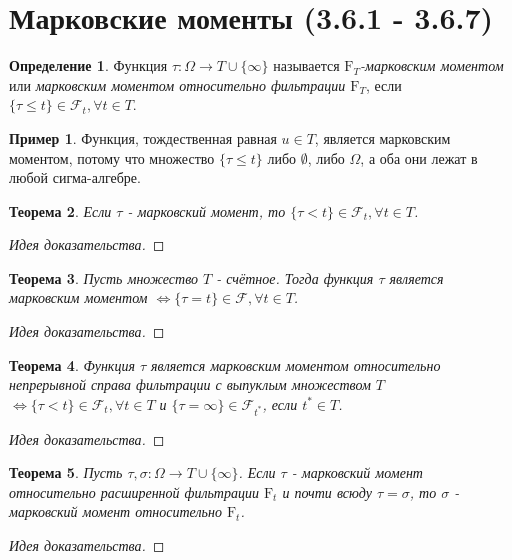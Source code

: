 \documentclass[16pt]{article}
\newtheorem{theorem}{Теорема}[section]
\theoremstyle{definition}
\newtheorem{definition}[theorem]{Определение}
\newtheorem{example}{Пример}[theorem]
\begin{document}
\section{Марковские моменты (3.6.1 - 3.6.7)}
\begin{definition}
Функция $\tau: \Omega \rightarrow T \cup \{\infty\}$ называется \textit{$\mathrm{F}_T$-марковским моментом} или \textit{марковским моментом относительно фильтрации $\mathrm{F}_T$}, если $\{\tau \le t\} \in \mathcal{F}_t, \forall t \in T$.
\end{definition}
\begin{example}
Функция, тождественная равная $u \in T$, является марковским моментом, потому что множество $\{\tau \le t\}$ либо $\emptyset$, либо $\Omega$, а оба они лежат в любой сигма-алгебре.
\end{example}
\begin{theorem}
Если $\tau$ - марковский момент, то $\{\tau < t\} \in \mathcal{F}_t, \forall t \in T$. 
\end{theorem}
\begin{proof}[Идея доказательства]

\end{proof}
\begin{theorem}
Пусть множество $T$ - счётное. Тогда функция $\tau$ является марковским моментом $\Longleftrightarrow \{\tau = t\} \in \mathcal{F}, \forall t \in T$.
\end{theorem}
\begin{proof}[Идея доказательства]

\end{proof}
\begin{theorem}
Функция $\tau$ является марковским моментом относительно непрерывной справа фильтрации с выпуклым множеством $T$ $\Longleftrightarrow \{\tau < t\} \in \mathcal{F}_t, \forall t \in T$ и $\{\tau = \infty\} \in \mathcal{F}_{t^*}$, если $t^* \in T$.
\end{theorem}
\begin{proof}[Идея доказательства]

\end{proof}
\begin{theorem}
Пусть $\tau, \sigma: \Omega \rightarrow T \cup \{\infty\}$. Если $\tau$ - марковский момент относительно расширенной фильтрации $\mathrm{F}_t$ и почти всюду $\tau = \sigma$, то $\sigma$ - марковский момент относительно $\mathrm{F}_t$.
\end{theorem}
\begin{proof}[Идея доказательства]

\end{proof}
\end{document}
